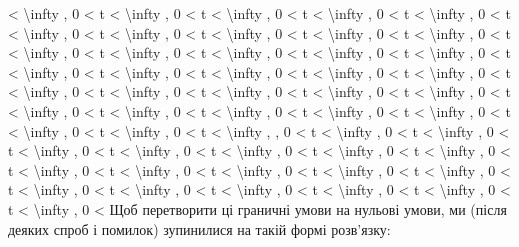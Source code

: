 \documentclass[
]{article}
\begin{document}
\textless{} \textbackslash infty , 0 \textless{} t \textless{}
\textbackslash infty , 0 \textless{} t \textless{} \textbackslash infty
, 0 \textless{} t \textless{} \textbackslash infty , 0 \textless{} t
\textless{} \textbackslash infty , 0 \textless{} t \textless{}
\textbackslash infty , 0 \textless{} t \textless{} \textbackslash infty
, 0 \textless{} t \textless{} \textbackslash infty , 0 \textless{} t
\textless{} \textbackslash infty , 0 \textless{} t \textless{}
\textbackslash infty , 0 \textless{} t \textless{} \textbackslash infty
, 0 \textless{} t \textless{} \textbackslash infty , 0 \textless{} t
\textless{} \textbackslash infty , 0 \textless{} t \textless{}
\textbackslash infty , 0 \textless{} t \textless{} \textbackslash infty
, 0 \textless{} t \textless{} \textbackslash infty , 0 \textless{} t
\textless{} \textbackslash infty , 0 \textless{} t \textless{}
\textbackslash infty , 0 \textless{} t \textless{} \textbackslash infty
, 0 \textless{} t \textless{} \textbackslash infty , 0 \textless{} t
\textless{} \textbackslash infty , 0 \textless{} t \textless{}
\textbackslash infty , 0 \textless{} t \textless{} \textbackslash infty
, 0 \textless{} t \textless{} \textbackslash infty , 0 \textless{} t
\textless{} \textbackslash infty , 0 \textless{} t \textless{}
\textbackslash infty , 0 \textless{} t \textless{} \textbackslash infty
, 0 \textless{} t \textless{} \textbackslash infty , 0 \textless{} t
\textless{} \textbackslash infty , 0 \textless{} t \textless{}
\textbackslash infty , 0 \textless{} t \textless{} \textbackslash infty
, 0 \textless{} t \textless{} \textbackslash infty , 0 \textless{} t
\textless{} \textbackslash infty , , 0 \textless{} t \textless{}
\textbackslash infty , 0 \textless{} t \textless{} \textbackslash infty
, 0 \textless{} t \textless{} \textbackslash infty , 0 \textless{} t
\textless{} \textbackslash infty , 0 \textless{} t \textless{}
\textbackslash infty , 0 \textless{} t \textless{} \textbackslash infty
, 0 \textless{} t \textless{} \textbackslash infty , 0 \textless{} t
\textless{} \textbackslash infty , 0 \textless{} t \textless{}
\textbackslash infty , 0 \textless{} t \textless{} \textbackslash infty
, 0 \textless{} t \textless{} \textbackslash infty , 0 \textless{} t
\textless{} \textbackslash infty , 0 \textless{} t \textless{}
\textbackslash infty , 0 \textless{} t \textless{} \textbackslash infty
, 0 \textless{} t \textless{} \textbackslash infty , 0 \textless{} t
\textless{} \textbackslash infty , 0 \textless{} t \textless{}
\textbackslash infty , 0 \textless{} t \textless{} \textbackslash infty
, 0 \textless{} Щоб перетворити ці граничні умови на нульові умови, ми
(після деяких спроб і помилок) зупинилися на такій формі розв'язку:
\end{document}
